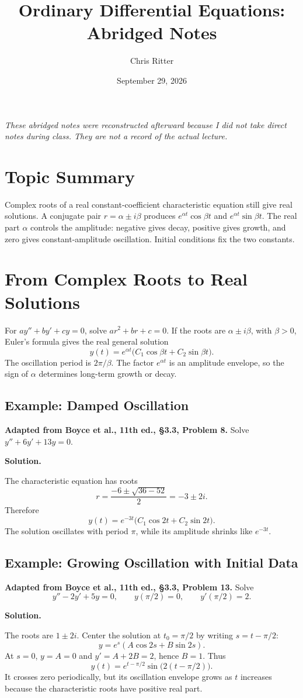 \documentclass[11pt]{article}
\title{Ordinary Differential Equations: Abridged Notes}
\author{Chris Ritter}
\date{September 29, 2026}
\newenvironment{solution}
    {\par\noindent\textbf{Solution.}\par}
    {\par}
\begin{document}
\maketitle
\begin{center}
\small\emph{These abridged notes were reconstructed afterward because I did not take
direct notes during class. They are not a record of the actual lecture.}
\end{center}
\tableofcontents
\newpage

\section{Topic Summary}
Complex roots of a real constant-coefficient characteristic equation
still give real solutions. A conjugate pair \(r=\alpha\pm i\beta\)
produces \(e^{\alpha t}\cos\beta t\) and
\(e^{\alpha t}\sin\beta t\). The real part \(\alpha\) controls the
amplitude: negative gives decay, positive gives growth, and zero
gives constant-amplitude oscillation. Initial conditions fix the two
constants.

\section{From Complex Roots to Real Solutions}
For \(ay''+by'+cy=0\), solve \(ar^2+br+c=0\). If the roots are
\(\alpha\pm i\beta\), with \(\beta>0\), Euler's formula gives the
real general solution
\[
\boxed{y(t)=e^{\alpha t}
\bigl(C_1\cos\beta t+C_2\sin\beta t\bigr).}
\]
The oscillation period is \(2\pi/\beta\). The factor
\(e^{\alpha t}\) is an amplitude envelope, so the sign of
\(\alpha\) determines long-term growth or decay.

\subsection{Example: Damped Oscillation}
\textbf{Adapted from Boyce et al., 11th ed., \S3.3, Problem 8.}
Solve \(y''+6y'+13y=0\).
\begin{solution}
The characteristic equation has roots
\[
r=\frac{-6\pm\sqrt{36-52}}{2}=-3\pm2i.
\]
Therefore
\[
\boxed{y(t)=e^{-3t}\bigl(C_1\cos2t+C_2\sin2t\bigr).}
\]
The solution oscillates with period \(\pi\), while its amplitude
shrinks like \(e^{-3t}\).
\end{solution}

\subsection{Example: Growing Oscillation with Initial Data}
\textbf{Adapted from Boyce et al., 11th ed., \S3.3, Problem 13.}
Solve
\[
y''-2y'+5y=0,\qquad y(\pi/2)=0,\qquad y'(\pi/2)=2.
\]
\begin{solution}
The roots are \(1\pm2i\). Center the solution at
\(t_0=\pi/2\) by writing \(s=t-\pi/2\):
\[
y=e^s(A\cos2s+B\sin2s).
\]
At \(s=0\), \(y=A=0\) and \(y'=A+2B=2\), hence \(B=1\). Thus
\[
\boxed{y(t)=e^{t-\pi/2}\sin\bigl(2(t-\pi/2)\bigr).}
\]
It crosses zero periodically, but its oscillation envelope grows as
\(t\) increases because the characteristic roots have positive real
part.
\end{solution}
\end{document}
